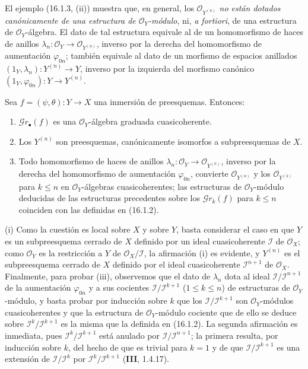 \begin{env}[16.1.4]
\label{IV.16.1.4}
El ejemplo (16.1.3, (ii)) muestra que, en general, los
$\mathcal{O}_{Y^{(n)}}$ \emph{no están dotados canónicamente de una estructura de
$\mathcal{O}_Y$-módulo}, ni, \emph{a fortiori}, de una estructura de
$\mathcal{O}_Y$-álgebra. El dato de tal estructura equivale al de un
homomorfismo de haces de anillos
$\lambda_n:\mathcal{O}_Y\to\mathcal{O}_{Y^{(n)}}$, inverso por la derecha del
homomorfismo de aumentación $\varphi_{0n}$; también equivale al dato
de un morfismo de espacios anillados
$(1_Y,\lambda_n):Y^{(n)}\to Y$, inverso por la izquierda del morfismo canónico
$(1_Y,\varphi_{0n}):Y\to Y^{(n)}$.
\end{env}

\begin{proposition}[16.1.5]
\label{IV.16.1.5}
Sea $f=(\psi,\theta):Y\to X$ una inmersión de preesquemas. Entonces:
\begin{enumerate}
\item[\textup{(i)}] $\mathscr{G}r_\bullet(f)$ es una $\mathcal{O}_Y$-álgebra graduada
cuasicoherente.
\item[\textup{(ii)}] Los $Y^{(n)}$ son preesquemas, canónicamente isomorfos a
subpreesquemas de $X$.
\item[\textup{(iii)}] Todo homomorfismo de haces de anillos
$\lambda_n:\mathcal{O}_Y\to\mathcal{O}_{Y^{(n)}}$, inverso por la derecha del
homomorfismo de aumentación $\varphi_{0n}$, convierte
$\mathcal{O}_{Y^{(n)}}$ y los $\mathcal{O}_{Y^{(k)}}$ para $k\leq n$ en
$\mathcal{O}_Y$-álgebras cuasicoherentes; las estructuras de
$\mathcal{O}_Y$-módulo deducidas de las estructuras precedentes sobre los
$\mathscr{G}r_k(f)$ para $k\leq n$ coinciden con las definidas en
\textup{(16.1.2)}.
\end{enumerate}
\end{proposition}

\noindent(i) Como la cuestión es local sobre $X$ y sobre $Y$, basta considerar el caso
en que $Y$ es un subpreesquema cerrado de $X$ definido por un ideal cuasicoherente
$\mathscr{I}$ de $\mathcal{O}_X$; como $\mathcal{O}_Y$ es la restricción a
$Y$ de $\mathcal{O}_X/\mathscr{I}$, la afirmación (i) es evidente, y $Y^{(n)}$
es el subpreesquema cerrado de $X$ definido por el ideal cuasicoherente
$\mathscr{I}^{n+1}$ de $\mathcal{O}_X$. Finalmente, para probar (iii), observemos que el
dato de $\lambda_n$ dota al ideal
$\mathscr{I}/\mathscr{I}^{n+1}$ de la aumentación $\varphi_{0n}$ y a sus
cocientes $\mathscr{I}/\mathscr{I}^{k+1}$ ($1\leq k\leq n$) de estructuras de
$\mathcal{O}_Y$-módulo, y basta probar por inducción sobre $k$ que los
$\mathscr{I}/\mathscr{I}^{k+1}$ son $\mathcal{O}_Y$-módulos
cuasicoherentes y que la estructura de $\mathcal{O}_Y$-módulo cociente que de ello se
deduce sobre $\mathscr{I}^k/\mathscr{I}^{k+1}$ es la misma que la definida en
(16.1.2). La segunda afirmación es inmediata, pues
$\mathscr{I}^k/\mathscr{I}^{k+1}$ está anulado por
$\mathscr{I}/\mathscr{I}^{n+1}$; la primera resulta, por inducción sobre $k$,
del hecho de que es trivial para $k=1$ y de que
$\mathscr{I}/\mathscr{I}^{k+1}$ es una extensión de
$\mathscr{I}/\mathscr{I}^k$ por
$\mathscr{I}^k/\mathscr{I}^{k+1}$ (\textbf{III}, 1.4.17).

